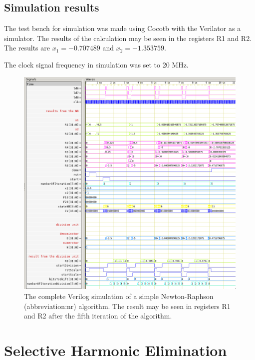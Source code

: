 \documentclass[a4paper, twoside, 11pt]{article}
\begin{document}
    \subsection{Simulation results}
        The test bench for simulation was made using Cocotb \cite{cocotb} with the Verilator \cite{verilator} as a simulator. The results of the calculation may be seen in the registers R1 and R2. The results are $x_1 = - 0.707489$ and $x_2 = - 1.353759$.\par
        The clock signal frequency in simulation was set to 20 MHz.
            \begin{figure}[htbp!]
                \centering
                \includegraphics[width=1\textwidth]{src/png/inverted/simple-nr-sim.png}
                \caption{The complete Verilog simulation of a simple Newton-Raphson (\gls{abbreviation:nr}) algorithm. The result may be seen in registers R1 and R2 after the fifth iteration of the algorithm.}
                \label{fig:simple-nr-sim}
            \end{figure}



\section{Selective Harmonic Elimination}\label{sec:selective-harmonic-elimination}
\end{document}
